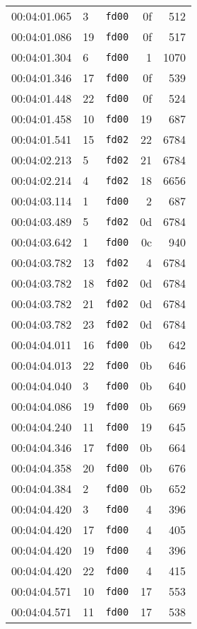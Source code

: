 \documentclass{article}
\begin{document}
\begin{longtable}{lllrr}
00:04:01.065 & 3 & \texttt{fd00} & 0f & 512 \\
00:04:01.086 & 19 & \texttt{fd00} & 0f & 517 \\
00:04:01.304 & 6 & \texttt{fd00} & 1 & 1070 \\
00:04:01.346 & 17 & \texttt{fd00} & 0f & 539 \\
00:04:01.448 & 22 & \texttt{fd00} & 0f & 524 \\
00:04:01.458 & 10 & \texttt{fd00} & 19 & 687 \\
00:04:01.541 & 15 & \texttt{fd02} & 22 & 6784 \\
00:04:02.213 & 5 & \texttt{fd02} & 21 & 6784 \\
00:04:02.214 & 4 & \texttt{fd02} & 18 & 6656 \\
00:04:03.114 & 1 & \texttt{fd00} & 2 & 687 \\
00:04:03.489 & 5 & \texttt{fd02} & 0d & 6784 \\
00:04:03.642 & 1 & \texttt{fd00} & 0c & 940 \\
00:04:03.782 & 13 & \texttt{fd02} & 4 & 6784 \\
00:04:03.782 & 18 & \texttt{fd02} & 0d & 6784 \\
00:04:03.782 & 21 & \texttt{fd02} & 0d & 6784 \\
00:04:03.782 & 23 & \texttt{fd02} & 0d & 6784 \\
00:04:04.011 & 16 & \texttt{fd00} & 0b & 642 \\
00:04:04.013 & 22 & \texttt{fd00} & 0b & 646 \\
00:04:04.040 & 3 & \texttt{fd00} & 0b & 640 \\
00:04:04.086 & 19 & \texttt{fd00} & 0b & 669 \\
00:04:04.240 & 11 & \texttt{fd00} & 19 & 645 \\
00:04:04.346 & 17 & \texttt{fd00} & 0b & 664 \\
00:04:04.358 & 20 & \texttt{fd00} & 0b & 676 \\
00:04:04.384 & 2 & \texttt{fd00} & 0b & 652 \\
00:04:04.420 & 3 & \texttt{fd00} & 4 & 396 \\
00:04:04.420 & 17 & \texttt{fd00} & 4 & 405 \\
00:04:04.420 & 19 & \texttt{fd00} & 4 & 396 \\
00:04:04.420 & 22 & \texttt{fd00} & 4 & 415 \\
00:04:04.571 & 10 & \texttt{fd00} & 17 & 553 \\
00:04:04.571 & 11 & \texttt{fd00} & 17 & 538 \\

\end{longtable}
\end{document}
